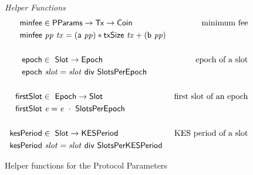 \begin{figure*}[htb]
  \emph{Helper Functions}
  \begin{align*}
    \mathsf{minfee} & \in \mathsf{PParams} \to \mathsf{Tx} \to \mathsf{Coin} & \text{minimum fee}\\
    \mathsf{minfee} & ~\mathit{pp}~\mathit{tx} =
    (\mathsf{a}~\mathit{pp}) * \mathsf{txSize}~\mathit{tx} + (\mathsf{b}~\mathit{pp})
    \\
    \\
    \mathsf{epoch} & \in ~ \mathsf{Slot} \to \mathsf{Epoch} & \text{epoch of a slot}
    \\
    \mathsf{epoch} & ~\mathit{slot} = \mathit{slot}~\mathsf{div}~\mathsf{SlotsPerEpoch}
    \\
    \\
    \mathsf{firstSlot} & \in ~ \mathsf{Epoch} \to \mathsf{Slot}
               & \text{first slot of an epoch}
    \\
    \mathsf{firstSlot} & ~\mathit{e} = \mathit{e}~\cdot~\mathsf{SlotsPerEpoch}
    \\
    \\
    \mathsf{kesPeriod} & \in ~ \mathsf{Slot} \to \mathsf{KESPeriod} & \text{KES period of a slot}
    \\
    \mathsf{kesPeriod} & ~\mathit{slot} = \mathit{slot}~\mathsf{div}~\mathsf{SlotsPerKESPeriod}
  \end{align*}
  \caption{Helper functions for the Protocol Parameters}
  \label{fig:defs:protocol-parameters-helpers}
\end{figure*}

\clearpage
